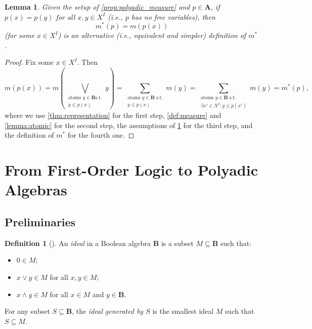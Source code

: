 \documentclass{article}
\newtheorem{lemma}{Lemma}
\theoremstyle{definition}
\newtheorem{definition}{Definition}
\theoremstyle{remark}
\begin{document}
\begin{lemma} \label{lemma:simple_measure}
  Given the setup of \cref{prop:polyadic_measure} and $p \in \mathbf{A}$, if
  $p(x) = p(y)$ for all $x, y \in X^I$ (i.e., $p$ has no free variables), then
  \[
    m^*(p) = m(p(x))
  \]
  (for some $x \in X^I$) is an alternative (i.e., equivalent and simpler)
  definition of $m^*$.
\end{lemma}
\begin{proof}
  Fix some $x \in X^I$. Then
  \[
    m(p(x)) = m \left( \bigvee_{\substack{\text{atoms } y \in \mathbf{B} \text{
            s.t.}\\
          y \le p(x)}} y \right) = \sum_{\substack{\text{atoms } y \in \mathbf{B}
        \text{ s.t.}\\
        y \le p(x)}} m(y) =\sum_{\substack{\text{atoms } y \in \mathbf{B}
        \text{ s.t.}\\
        \exists x' \in X^I : y \le p(x')}} m(y) = m^*(p),
  \]
  where we use \cref{thm:representation} for the first step,
  \cref{def:measure} and \cref{lemma:atomic} for the second step, the
  assumptions of \cref{lemma:simple_measure} for the third step, and the
  definition of $m^*$ for the fourth one.
\end{proof}

\section{From First-Order Logic to Polyadic Algebras}

\subsection{Preliminaries}

\begin{definition}[\cite{givant2008introduction}] \label{def:boolean_ideal}
  An \emph{ideal} in a Boolean algebra $\mathbf{B}$ is a subset $M \subseteq
  \mathbf{B}$ such that:
  \begin{itemize}
  \item $0 \in M$;
  \item $x \lor y \in M$ for all $x, y \in M$;
  \item $x \land y \in M$ for all $x \in M$ and $y \in \mathbf{B}$.
  \end{itemize}
  For any subset $S \subseteq \mathbf{B}$, the \emph{ideal generated by $S$} is
  the smallest ideal $M$ such that $S \subseteq M$.
\end{definition}
\end{document}
